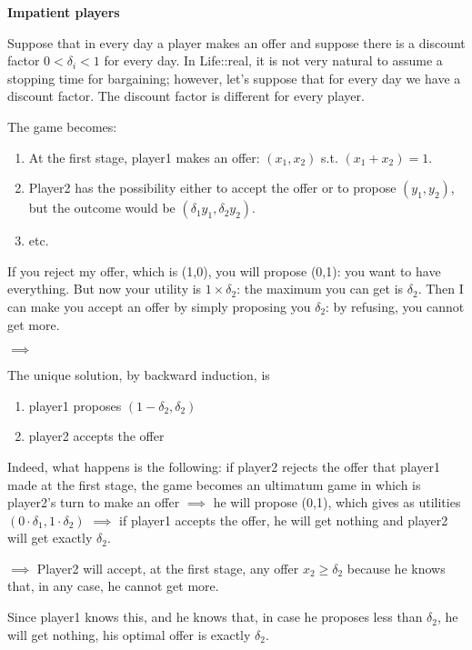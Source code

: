 \bigskip
\noindent \textbf{Impatient players}

\noindent Suppose that in every day a player makes an offer and suppose there is a 
discount factor $0 < \delta_i < 1$ for every day. In Life::real, it is not very natural to 
assume a stopping time for bargaining; however, let's suppose that for every 
day we have a discount factor. The discount factor is different for 
every player. 

\noindent The game becomes:
\begin{enumerate}
	\item At the first stage, player1 makes an offer: $(x_1,x_2)$ s.t. $(x_1+ x_2) = 1$.
	\item Player2 has the possibility either to accept the offer or to propose $(y_1,y_2)$, but the outcome would be $(\delta_1y_1,\delta_2y_2)$.
	\item etc.
\end{enumerate}

\noindent If you reject my offer, which is (1,0), you will propose (0,1): you 
want to have everything. But now your utility is $1 \times \delta_2$: the 
maximum you can get is $\delta_2$. Then I can make you accept an offer by 
simply proposing you $\delta_2$: by refusing, you cannot get more. 

\noindent $\implies$

\noindent The unique solution, by backward induction, is
\begin{enumerate}
	\item player1 proposes $(1-\delta_2, \delta_2)$
	\item player2 accepts the offer
\end{enumerate}

\noindent Indeed, what happens is the following: if player2 rejects the offer that player1 made at the first stage, the game becomes an ultimatum game in which is player2's turn to make an offer $\implies$ he will propose (0,1), which gives as utilities $(0 \cdot \delta_1, 1 \cdot \delta_2)$ $\implies$ if player1 accepts the offer, he will get nothing and player2 will get exactly $\delta_2$.

\noindent $\implies$ Player2 will accept, at the first stage, any offer $x_2 \geq \delta_2$ because he knows that, in any case, he cannot get more.

\noindent Since player1 knows this, and he knows that, in case he proposes less than $\delta_2$, he will get nothing, his optimal offer is exactly $\delta_2$.

